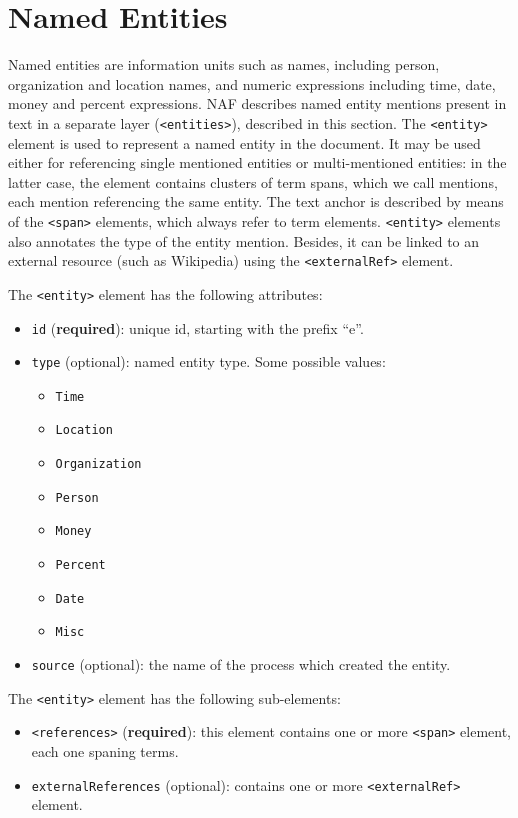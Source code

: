 
\section{Named Entities}
\label{sec:named-entities}

Named entities are information units such as names, including person,
organization and location names, and numeric expressions including time,
date, money and percent expressions. NAF describes named entity mentions
present in text in a separate layer (\texttt{<entities>}), described in this
section. The \texttt{<entity>} element is used to represent a named entity
in the document. It may be used either for referencing single mentioned
entities or multi-mentioned entities: in the latter case, the element
contains clusters of term spans, which we call mentions, each mention
referencing the same entity. The text anchor is described by means of the
\texttt{<span>} elements, which always refer to term
elements. \texttt{<entity>} elements also annotates the type of the entity
mention. Besides, it can be linked to an external resource (such as
Wikipedia) using the \texttt{<externalRef>} element.

The \texttt{<entity>} element has the following attributes:
\begin{itemize}
\item \texttt{id} (\textbf{required}): unique id, starting with the prefix ``e''.
\item \texttt{type} (optional): named entity type. Some possible values:
  \begin{itemize}
  \item \texttt{Time}
  \item \texttt{Location}
  \item \texttt{Organization}
  \item \texttt{Person}
  \item \texttt{Money}
  \item \texttt{Percent}
  \item \texttt{Date}
  \item \texttt{Misc}
\end{itemize}
\item \texttt{source} (optional): the name of the process which created the
  entity.
\end{itemize}

The \texttt{<entity>} element has the following sub-elements:
\begin{itemize}
\item \texttt{<references>} (\textbf{required}): this element contains one or
  more \texttt{<span>} element, each one spaning terms.
\item \texttt{externalReferences} (optional): contains one or more
  \texttt{<externalRef>} element.
\end{itemize}


